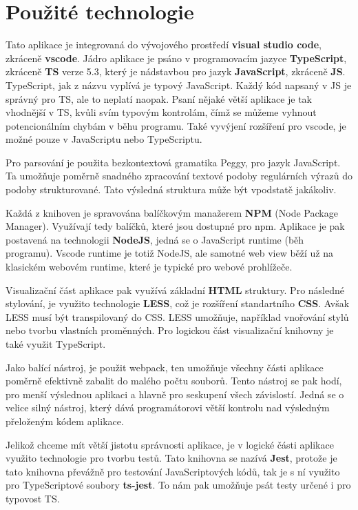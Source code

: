 \newpage

\section{Použité technologie}\label{sec:USEDtech}
Tato aplikace je integrovaná do vývojového prostředí \textbf{visual studio code}, 
zkráceně \textbf{vscode}. Jádro aplikace je psáno v programovacím jazyce \textbf{TypeScript}, zkráceně \textbf{TS} verze 5.3, který je nádstavbou
pro jazyk \textbf{JavaScript}, zkráceně \textbf{JS}. TypeScript, jak z názvu vyplívá je typový JavaScript.
Každý kód napsaný v JS je správný pro TS, ale to neplatí naopak.
Psaní nějaké větší aplikace je tak vhodnější v TS, 
kvůli svím typovým kontrolám, čímž se můžeme vyhnout potencionálním chybám v běhu programu.
Také vyvýjení rozšíření pro vscode, je možné pouze v JavaScriptu nebo TypeScriptu.

Pro parsování je použita bezkontextová gramatika Peggy, pro jazyk JavaScript.
Ta umožňuje poměrně snadného zpracování textové podoby regulárních výrazů do podoby strukturované.
Tato výsledná struktura může být vpodstatě jakákoliv.

Každá z knihoven je spravována balíčkovým manažerem \textbf{NPM} (Node Package Manager).
Využívají tedy balíčků, které jsou dostupné pro npm. 
Aplikace je pak postavená na technologii \textbf{NodeJS}, 
jedná se o JavaScript runtime (běh programu). 
Vscode runtime je totiž NodeJS, ale samotné web view běží už na klasickém webovém runtime, které je typické pro webové prohlížeče.

Visualizační část aplikace pak využívá základní \textbf{HTML} struktury. 
Pro následné stylování, je využito technologie \textbf{LESS}, což je rozšíření standartního \textbf{CSS}.
Avšak LESS musí být transpilovaný do CSS. LESS umožňuje, například vnořování stylů nebo tvorbu vlastních proměnných.
Pro logickou část visualizační knihovny je také využit TypeScript.

Jako balící nástroj, je použit webpack, 
ten umožňuje všechny části aplikace poměrně efektivně zabalit do malého počtu souborů. 
Tento nástroj se pak hodí, pro menší výslednou aplikaci a hlavně pro seskupení všech závislostí.
Jedná se o velice silný nástroj, který dává programátorovi větší kontrolu nad výsledným přeloženým kódem aplikace.

Jelikož chceme mít větší jistotu správnosti aplikace, je v logické části aplikace využito technologie pro tvorbu testů. 
Tato knihovna se nazívá \textbf{Jest}, protože je tato knihovna převážně pro testování JavaScriptových kódů, 
tak je s ní využito pro TypeScriptové soubory \textbf{ts-jest}. To nám pak umožňuje psát testy určené i pro typovost TS.

